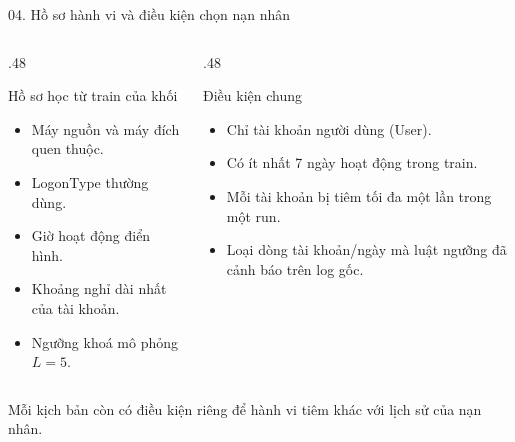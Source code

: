 \documentclass[aspectratio=169, 10pt]{beamer}
\begin{document}
\begin{frame}{04. Hồ sơ hành vi và điều kiện chọn nạn nhân}
\begin{columns}[T,onlytextwidth]
\begin{column}{.48\textwidth}
\begin{block}{Hồ sơ học từ train của khối}
\begin{itemize}\setlength\itemsep{7pt}
\item Máy nguồn và máy đích quen thuộc.
\item LogonType thường dùng.
\item Giờ hoạt động điển hình.
\item Khoảng nghỉ dài nhất của tài khoản.
\item Ngưỡng khoá mô phỏng $L=5$.
\end{itemize}
\end{block}
\end{column}
\begin{column}{.48\textwidth}
\begin{exampleblock}{Điều kiện chung}
\begin{itemize}\setlength\itemsep{7pt}
\item Chỉ tài khoản người dùng (User).
\item Có ít nhất 7 ngày hoạt động trong train.
\item Mỗi tài khoản bị tiêm tối đa một lần trong một run.
\item Loại dòng tài khoản/ngày mà luật ngưỡng đã cảnh báo trên log gốc.
\end{itemize}
\end{exampleblock}
\end{column}
\end{columns}
\vspace{.6em}
\small Mỗi kịch bản còn có điều kiện riêng để hành vi tiêm khác với lịch sử của nạn nhân.
\end{frame}
\end{document}
